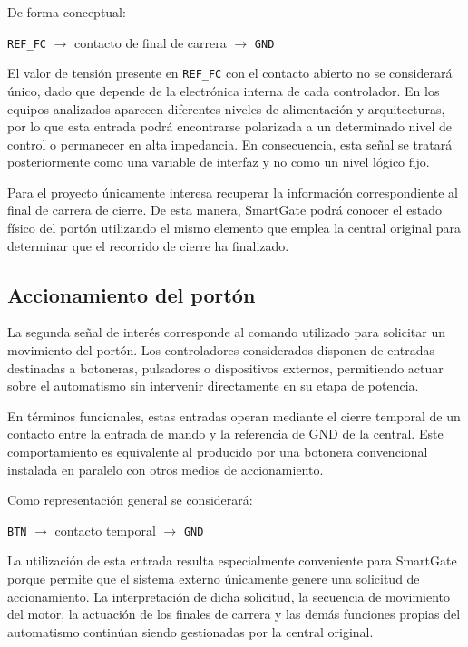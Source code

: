 De forma conceptual:

\begin{center}
\texttt{REF\_FC} $\rightarrow$ contacto de final de carrera $\rightarrow$ \texttt{GND}
\end{center}

El valor de tensión presente en \texttt{REF\_FC} con el contacto abierto no se considerará único, dado que depende de la electrónica interna de cada controlador. En los equipos analizados aparecen diferentes niveles de alimentación y arquitecturas, por lo que esta entrada podrá encontrarse polarizada a un determinado nivel de control o permanecer en alta impedancia. En consecuencia, esta señal se tratará posteriormente como una variable de interfaz y no como un nivel lógico fijo.

Para el proyecto únicamente interesa recuperar la información correspondiente al final de carrera de cierre. De esta manera, SmartGate podrá conocer el estado físico del portón utilizando el mismo elemento que emplea la central original para determinar que el recorrido de cierre ha finalizado.

\subsection{Accionamiento del portón}

La segunda señal de interés corresponde al comando utilizado para solicitar un movimiento del portón. Los controladores considerados disponen de entradas destinadas a botoneras, pulsadores o dispositivos externos, permitiendo actuar sobre el automatismo sin intervenir directamente en su etapa de potencia.

En términos funcionales, estas entradas operan mediante el cierre temporal de un contacto entre la entrada de mando y la referencia de GND de la central. Este comportamiento es equivalente al producido por una botonera convencional instalada en paralelo con otros medios de accionamiento.

Como representación general se considerará:

\begin{center}
\texttt{BTN} $\rightarrow$ contacto temporal $\rightarrow$ \texttt{GND}
\end{center}

La utilización de esta entrada resulta especialmente conveniente para SmartGate porque permite que el sistema externo únicamente genere una solicitud de accionamiento. La interpretación de dicha solicitud, la secuencia de movimiento del motor, la actuación de los finales de carrera y las demás funciones propias del automatismo continúan siendo gestionadas por la central original.

